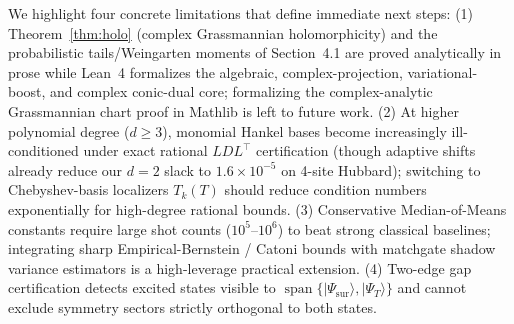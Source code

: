 \documentclass[11pt,a4paper]{article}
\theoremstyle{definition}
\newcommand{\ket}[1]{\lvert #1 \rangle}
\begin{document}
We highlight four concrete limitations that define immediate next steps: (1) Theorem~\ref{thm:holo} (complex Grassmannian holomorphicity) and the probabilistic tails/Weingarten moments of Section~4.1 are proved analytically in prose while Lean~4 formalizes the algebraic, complex-projection, variational-boost, and complex conic-dual core; formalizing the complex-analytic Grassmannian chart proof in Mathlib is left to future work. (2) At higher polynomial degree ($d \ge 3$), monomial Hankel bases become increasingly ill-conditioned under exact rational $LDL^\top$ certification (though adaptive shifts already reduce our $d=2$ slack to $1.6\times 10^{-5}$ on 4-site Hubbard); switching to Chebyshev-basis localizers $T_k(T)$ should reduce condition numbers exponentially for high-degree rational bounds. (3) Conservative Median-of-Means constants require large shot counts ($10^5$--$10^6$) to beat strong classical baselines; integrating sharp Empirical-Bernstein / Catoni bounds with matchgate shadow variance estimators is a high-leverage practical extension. (4) Two-edge gap certification detects excited states visible to $\operatorname{span}\{\ket{\Psi_{\mathrm{sur}}}, \ket{\Psi_T}\}$ and cannot exclude symmetry sectors strictly orthogonal to both states.



\end{document}
